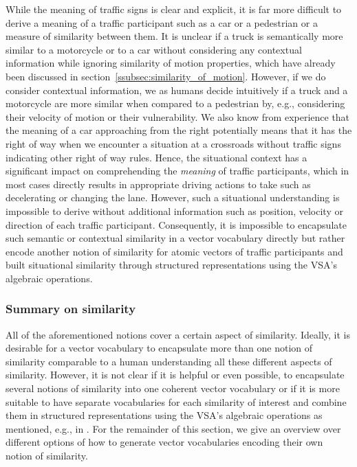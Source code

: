 While the meaning of traffic signs is clear and explicit, it is far more difficult to derive a meaning of a traffic participant such as a car or a pedestrian or a measure of similarity between them.
It is unclear if a truck is semantically more similar to a motorcycle or to a car without considering any contextual information while ignoring similarity of motion properties, which have already been discussed in section~\ref{ssubsec:similarity_of_motion}.
However, if we do consider contextual information, we as humans decide intuitively if a truck and a motorcycle are more similar when compared to a pedestrian by, e.g., considering their velocity of motion or their vulnerability.
We also know from experience that the meaning of a car approaching from the right potentially means that it has the right of way when we encounter a situation at a crossroads without traffic signs indicating other right of way rules. 
Hence, the situational context has a significant impact on comprehending the \emph{meaning} of traffic participants, which in most cases directly results in appropriate driving actions to take such as decelerating or changing the lane.
However, such a situational understanding is impossible to derive without additional information such as position, velocity or direction of each traffic participant.
Consequently, it is impossible to encapsulate such semantic or contextual similarity in a vector vocabulary directly but rather encode another notion of similarity for atomic vectors of traffic participants and built situational similarity through structured representations using the \ac{VSA}'s algebraic operations.

\subsubsection{Summary on similarity}%
\label{ssubsec:summary_similarity}

All of the aforementioned notions cover a certain aspect of similarity.
Ideally, it is desirable for a vector vocabulary to encapsulate more than one notion of similarity comparable to a human understanding all these different aspects of similarity.
However, it is not clear if it is helpful or even possible, to encapsulate several notions of similarity into one coherent vector vocabulary or if it is more suitable to have separate vocabularies for each similarity of interest and combine them in structured representations using the \ac{VSA}'s algebraic operations as mentioned, e.g., in \textcite{Crawford2016}.
For the remainder of this section, we give an overview over different options of how to generate vector vocabularies encoding their own notion of similarity.

